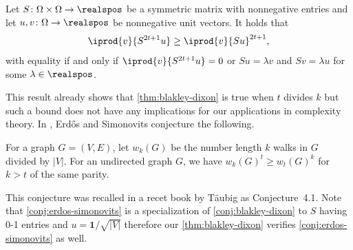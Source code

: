 \begin{theorem}
Let $S\colon\Omega\times\Omega\to\realspos$ be a 
symmetric matrix
with nonnegative entries and let 
$u,v\colon\Omega\to\realspos$ be
nonnegative unit vectors.
It holds that
\begin{align*}
\iprod{v}{S^{2t+1}u} \ge \iprod{v}{Su}^{2t+1},
\end{align*}
with equality if and only if 
$\iprod{v}{S^{2t+1}u} =0$ or 
$Su=\lambda v$ and 
$Sv=\lambda u$ 
for some $\lambda\in\realspos$.
\end{theorem}
This result already shows that 
\autoref{thm:blakley-dixon} is true when $t$ divides $k$ 
but such a bound does not have any implications for 
our applications in complexity theory. In \cite{ErdosS1982},
Erdős and Simonovits conjecture the following.
\begin{conjecture}
\label{conj:erdos-simonovits}
For a graph $G=(V,E)$, let $w_k(G)$ be the number length 
$k$ walks in $G$ divided by $|V|$.
For an undirected graph $G$, we have 
$w_k(G)^t\ge w_t(G)^k$ for $k>t$ of the same parity.
\end{conjecture}
This conjecture was recalled in a recet book
\cite{Taubig2017} by Täubig as Conjecture~4.1.
Note that \autoref{conj:erdos-simonovits} is a 
specialization of \autoref{conj:blakley-dixon} to
$S$ having 0-1 entries and  
$u=\mathbf{1}/\sqrt{|V|}$ therefore our 
\autoref{thm:blakley-dixon} verifies 
\autoref{conj:erdos-simonovits} as well.



